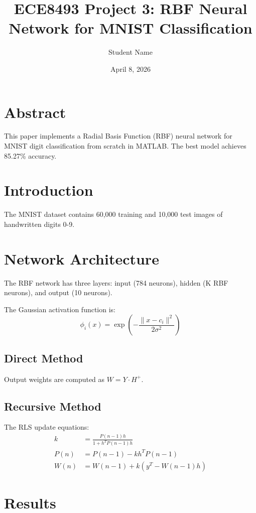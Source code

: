 \documentclass[12pt]{article}
\begin{document}
\title{ECE8493 Project 3: RBF Neural Network for MNIST Classification}
\author{Student Name}
\date{April 8, 2026}
\maketitle

\section*{Abstract}
This paper implements a Radial Basis Function (RBF) neural network for MNIST digit classification from scratch in MATLAB. The best model achieves 85.27\% accuracy.

\section{Introduction}
The MNIST dataset contains 60,000 training and 10,000 test images of handwritten digits 0-9.

\section{Network Architecture}
The RBF network has three layers: input (784 neurons), hidden (K RBF neurons), and output (10 neurons).

The Gaussian activation function is:
\begin{equation}
\phi_i(x) = \exp\left(-\frac{\|x - c_i\|^2}{2\sigma^2}\right)
\end{equation}

\subsection{Direct Method}
Output weights are computed as $W = Y \cdot H^{+}$.

\subsection{Recursive Method}
The RLS update equations:
\begin{align}
k &= \frac{P(n-1) h}{1 + h^T P(n-1) h} \\
P(n) &= P(n-1) - k h^T P(n-1) \\
W(n) &= W(n-1) + k (y^T - W(n-1) h)
\end{align}

\section{Results}
\end{document}
